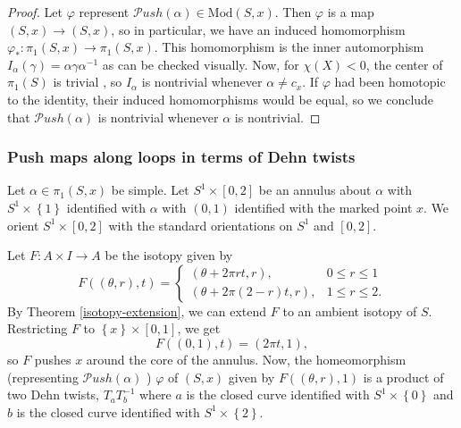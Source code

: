 \documentclass[reqno]{amsart}
\theoremstyle{definition}
\theoremstyle{remark}
\newcommand{\Mod}{{\mathrm{Mod}}}
\newcommand{\Push}{{\mathcal{P}}ush}
\begin{document}
 \begin{proof}
     Let $\varphi $ represent 
     $\Push \left( \alpha \right) \in 
     \Mod \left( S,x \right) $. Then
     $\varphi $ is a map
     $\left( S,x \right) \to \left( S,x \right) $, so
     in particular, we have an induced homomorphism
     $\varphi_* \colon \pi_1 \left( S,x \right) 
     \to \pi_1 \left( S,x \right) $.
     This homomorphism is the inner automorphism
     $I_{\alpha} (\gamma) = \alpha \gamma \alpha^{-1}$ as
     can be checked visually.
     Now, for $\chi (X) < 0$, the center of $\pi_1 (S)$ is
     trivial \cite[p. 22]{Farb-Margalit}, so $I_{\alpha}$ is nontrivial whenever
     $\alpha \neq c_{x}$. If $\varphi $ had been
     homotopic to the identity, their
     induced homomorphisms would be equal, so we conclude
     that $\Push \left( \alpha \right) $ is nontrivial whenever
     $\alpha$ is nontrivial.
 \end{proof}

 \subsubsection{Push maps along loops in terms of Dehn twists}

 Let $\alpha \in \pi_1 \left( S,x \right) $ be simple.
 Let $S^{1} \times \left[ 0,2 \right] $ be an annulus
 about $\alpha$ with $S^{1} \times \left\{ 1 \right\} $ 
 identified with $\alpha$ with
 $(0,1)$ identified with the marked point
 $x$. We orient 
 $S^{1} \times \left[ 0,2 \right] $ with the
 standard orientations on
 $S^{1}$ and $\left[ 0,2 \right] $. 

 Let $F \colon A \times I \to A$ be the
 isotopy given by
 \[
 F \left( \left( \theta,r \right) ,t \right) 
 = 
 \begin{cases}
     \left( \theta + 2\pi r t, r \right) ,& 0 \le r \le 1\\
     \left( \theta + 2 \pi (2-r)t,r \right) ,& 1 \le r \le 2.
 \end{cases}
 \]
 By Theorem \ref{isotopy-extension}, we can extend
 $F$ to an ambient isotopy of $S$. Restricting
 $F$ to $\left\{ x \right\} \times \left[ 0,1 \right] $, we
 get
 \[
 F\left( (0,1),t \right) = \left( 2 \pi t,1 \right),
 \] 
 so $F$ pushes $x$ around the core of the annulus.
 Now, the homeomorphism (representing $\Push\left( \alpha \right) $ )
 $\varphi $ of $\left( S,x \right) $ given by
 $F\left( (\theta, r),1 \right) $ is a product
 of two Dehn twists,  $T_a T_{b}^{-1}$ where
 $a$ is the closed curve identified with
 $S^{1} \times \left\{ 0 \right\} $ and
 $b$ is the closed curve identified with
 $S^{1} \times \left\{ 2 \right\} $.
\end{document}
